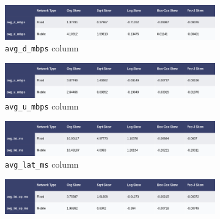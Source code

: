 \documentclass[
  letterpaper,
  DIV=11,
  numbers=noendperiod,
  oneside]{scrartcl}
\begin{document}
\begin{figure}

{\centering 

\begin{figure}

{\centering \includegraphics{tskew_d.png}

}

\caption{\texttt{avg\_d\_mbps} column}

\end{figure}

\begin{figure}

{\centering \includegraphics{tskew_u.png}

}

\caption{\texttt{avg\_u\_mbps} column}

\end{figure}

\begin{figure}

{\centering \includegraphics{tskew_lat.png}

}

\caption{\texttt{avg\_lat\_ms} column}

\end{figure}

\begin{figure}

{\centering \includegraphics{tskew_up.png}

}


\end{figure}}
\end{figure}
\end{document}
